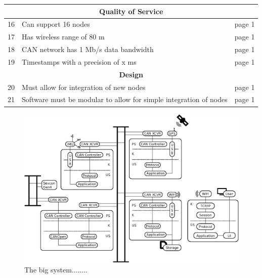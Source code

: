 \begin{table}[h]
\begin{tabular}{ |p{0.3cm}|p{8.5cm}|p{1cm}| }
\hline
\multicolumn{3}{|c|}{\textbf{Quality of Service}}\\
\hline	
16 & Can support 16 nodes							 	& page 1 \\
17 & Has wireless range of 80 m						 	& page 1 \\
18 & CAN network has 1 Mb/s data bandwidth			 	& page 1 \\
19 & Timestamps with a precision of x ms 			 	& page 1 \\

\hline
\multicolumn{3}{|c|}{\textbf{Design}}\\
\hline	
20 & Must allow for integration of new nodes		 					& page 1 \\
21 & Software must be modular to allow for simple integration of nodes	& page 1 \\

\hline
\end{tabular}
\end{table}

\newpage
\begin{figure}[!h]
	\centering
	\includegraphics[angle=90,width=\textwidth]{graphics/analysis_complex.eps}
	\caption{The big system........}
	\label{fig:complete_system}
\end{figure}



